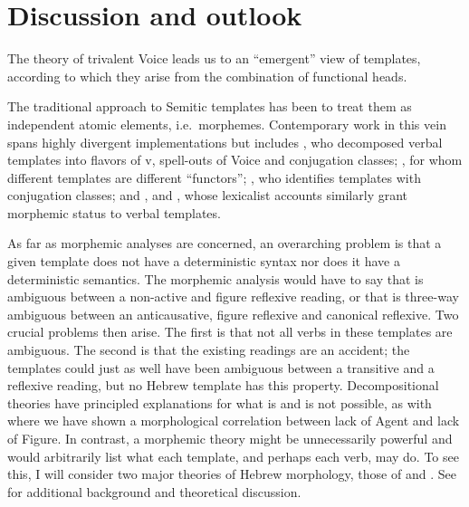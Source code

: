 \section{Discussion and outlook} \label{vz:others}
The theory of trivalent Voice leads us to an ``emergent'' view of templates, according to which they arise from the combination of functional heads.

The traditional approach to Semitic templates has been to treat them as independent atomic elements, i.e.~morphemes. Contemporary work in this vein spans highly divergent implementations but includes \cite{arad03,arad05}, who decomposed verbal templates into flavors of v, spell-outs of Voice and conjugation classes; \cite{borer13oup}, for whom different templates are different ``functors''; \cite{aronoff94,aronoff07}, who identifies templates with conjugation classes; and \cite{reinhartsiloni05}, \cite{schwarzwald08} and \cite{laks11,laks14}, whose lexicalist accounts similarly grant morphemic status to verbal templates.


As far as morphemic analyses are concerned, an overarching problem is that a given template does not have a deterministic syntax nor does it have a deterministic semantics. The morphemic analysis would have to say that {\tnif} is ambiguous between a non-active and figure reflexive reading, or that {\thit} is three-way ambiguous between an anticausative, figure reflexive and canonical reflexive. Two crucial problems then arise. The first is that not all verbs in these templates are ambiguous. The second is that the existing readings are an accident; the templates could just as well have been ambiguous between a transitive and a reflexive reading, but no Hebrew template has this property. Decompositional theories have principled explanations for what is and is not possible, as with {\tnif} where we have shown a morphological correlation between lack of Agent and lack of Figure. In contrast, a morphemic theory might be unnecessarily powerful and would arbitrarily list what each template, and perhaps each verb, may do. To see this, I will consider two major theories of Hebrew morphology, those of \cite{doron03,doron13voice} and \cite{arad03,arad05}. See \cite{kastnertucker19cup} for additional background and theoretical discussion.

